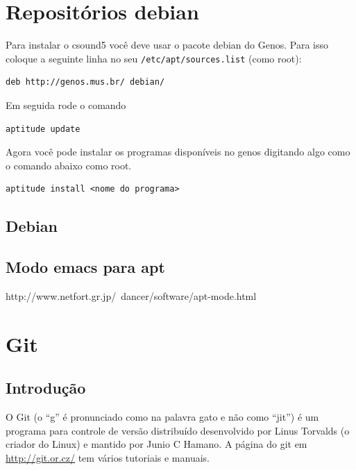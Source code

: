 \documentclass[12pt,brazil]{book}
\begin{document}
\chapter{Repositórios debian}
\label{cha:repositorios-debian}

Para instalar o csound5 você deve usar o pacote debian do Genos. Para
isso coloque a seguinte linha no seu \texttt{/etc/apt/sources.list}
(como root):

\begin{verbatim}
deb http://genos.mus.br/ debian/
\end{verbatim}

Em seguida rode o comando

\begin{verbatim}
aptitude update
\end{verbatim}

Agora você pode instalar os programas disponíveis no genos digitando
algo como o comando abaixo como root.

\begin{verbatim}
aptitude install <nome do programa>
\end{verbatim}

\section{Debian}
\label{sec:debian}

\section{Modo emacs para apt}
\label{sec:modo-emacs-para}

http://www.netfort.gr.jp/~dancer/software/apt-mode.html

\chapter{Git}
\label{cha:git}

\section{Introdução}
\label{sec:introducao}

O Git (o ``g'' é pronunciado como na palavra gato e não como ``jit'')
é um programa para controle de versão distribuído desenvolvido por
Linus Torvalds (o criador do Linux) e mantido por Junio C Hamano. A
página do git em \url{http://git.or.cz/} tem vários tutoriais e
manuais.
\end{document}
